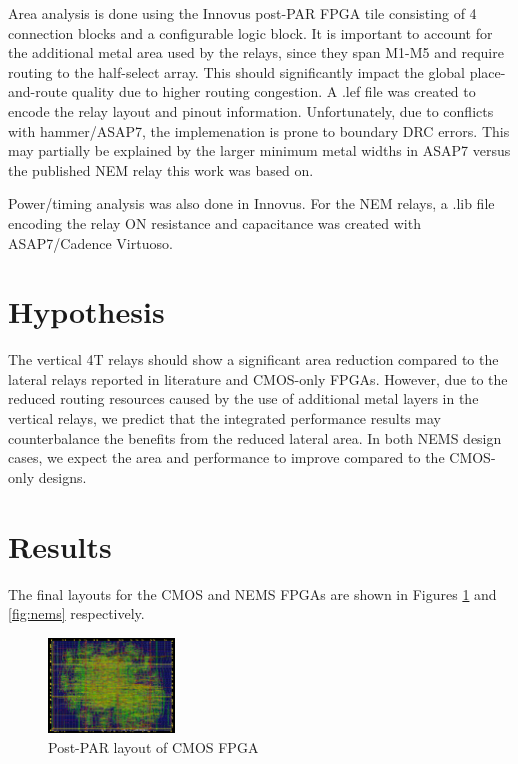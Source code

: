 \documentclass[twoside,twocolumn]{article}
\begin{document}
Area analysis is done using the Innovus post-PAR FPGA tile consisting of 4 connection blocks and a configurable logic block.
It is important to account for the additional metal area used by the relays, since they span M1-M5 and require routing to the half-select array. This should significantly impact the global place-and-route quality due to higher routing congestion. A .lef file was created to encode the relay layout and pinout information. Unfortunately, due to conflicts with hammer/ASAP7, the implemenation is prone to boundary DRC errors. This may partially be explained by the larger minimum metal widths in ASAP7 versus the published NEM relay this work was based on.

Power/timing analysis was also done in Innovus. For the NEM relays, a .lib file encoding the relay ON resistance and capacitance was created with ASAP7/Cadence Virtuoso.



\section{Hypothesis}
The vertical 4T relays should show a significant area reduction compared to the
lateral relays reported in literature and CMOS-only FPGAs. However, due to the reduced routing resources caused
by the use of additional metal layers in the vertical relays, we predict that the integrated
performance results may counterbalance the benefits from the reduced lateral area. In both NEMS design 
cases, we expect the area and performance to improve compared to the CMOS-only designs.

\section{Results}
The final layouts for the CMOS and NEMS FPGAs are shown in Figures \ref{fig:cmos}
and \ref{fig:nems} respectively. 

\begin{figure}[!hbt]
    \centering
    \caption{Post-PAR layout of CMOS FPGA}
    \label{fig:cmos}
    \includegraphics[width=0.3\textwidth]{figs/cmos_innovus.png}
\end{figure}
\end{document}
